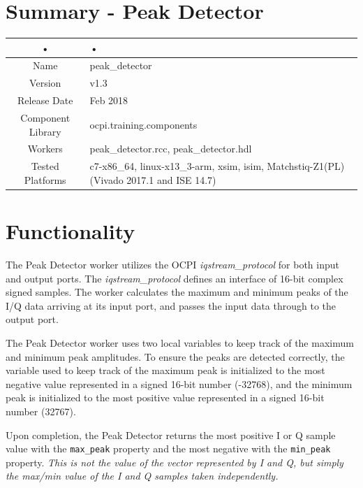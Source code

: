\documentclass{article}
\author{} %
\date{Version \docVersion} %
\title{\docTitle}
\def\comp{peak\_detector}
\def\Comp{Peak Detector}
\begin{document}
\section*{Summary - \Comp}
	\begin{tabular}{|c|M{13.5cm}|}
		\hline
		• & • \\
		\hline
		Name & \comp\\
		\hline
		Version & v1.3 \\
		\hline
		Release Date & Feb 2018 \\
		\hline
		Component Library & ocpi.training.components \\
		\hline
		Workers & \comp.rcc, \comp.hdl \\
		\hline
		Tested Platforms & c7-x86\_64, linux-x13\_3-arm, xsim, isim, Matchstiq-Z1(PL)(Vivado 2017.1 and ISE 14.7) \\
		\hline
	\end{tabular}
\section*{Functionality}
\begin{flushleft}
The {\Comp} worker utilizes the OCPI \textit{iqstream\_protocol} for both input and output ports. The \textit{iqstream\_protocol} defines an interface of 16-bit complex signed samples. The worker calculates the maximum and minimum peaks of the I/Q data arriving at its input port, and passes the input data through to the output port.
\newline

The {\Comp} worker uses two local variables to keep track of the maximum and minimum peak amplitudes. To ensure the peaks are detected correctly, the variable used to keep track of the maximum peak is initialized to the most negative value represented in a signed 16-bit number (-32768), and the minimum peak is initialized to the most positive value represented in a signed 16-bit number (32767). \newline

Upon completion, the {\Comp} returns the most positive I or Q sample value with the \verb+max_peak+ property and the most negative with the \verb+min_peak+ property. \textit{This is not the value of the vector represented by I and Q, but simply the max/min value of the I and Q samples taken independently.}\newline

\end{flushleft}
\end{document}
